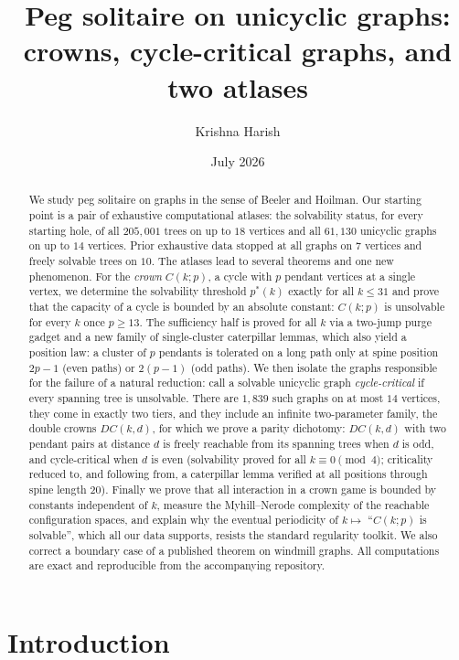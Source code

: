 \documentclass[11pt]{article}
\title{Peg solitaire on unicyclic graphs:\\ crowns, cycle-critical graphs, and two atlases}
\author{Krishna Harish}
\date{July 2026}
\theoremstyle{definition}
\begin{document}
\maketitle

\begin{abstract}
We study peg solitaire on graphs in the sense of Beeler and Hoilman.
Our starting point is a pair of exhaustive computational atlases: the
solvability status, for every starting hole, of all $205{,}001$ trees
on up to $18$ vertices and all $61{,}130$ unicyclic graphs on up to
$14$ vertices. Prior exhaustive data stopped at all graphs on $7$
vertices and freely solvable trees on $10$. The atlases lead to
several theorems and one new phenomenon. For the \emph{crown}
$C(k;p)$, a cycle with $p$ pendant vertices at a single vertex, we
determine the solvability threshold $p^*(k)$ exactly for all
$k\le 31$ and prove that the capacity of a cycle is bounded by an
absolute constant: $C(k;p)$ is unsolvable for every $k$ once
$p\ge 13$. The sufficiency half is proved for all $k$ via a
two-jump purge gadget and a new family of single-cluster caterpillar
lemmas, which also yield a position law: a cluster of $p$ pendants is
tolerated on a long path only at spine position $2p-1$ (even paths)
or $2(p-1)$ (odd paths). We then isolate the graphs responsible for
the failure of a natural reduction: call a solvable unicyclic graph
\emph{cycle-critical} if every spanning tree is unsolvable. There
are $1{,}839$ such graphs on at most $14$ vertices, they come in
exactly two tiers, and they include an infinite two-parameter family,
the double crowns $DC(k,d)$, for which we prove a parity dichotomy:
$DC(k,d)$ with two pendant pairs at distance $d$ is freely reachable
from its spanning trees when $d$ is odd, and cycle-critical when $d$
is even (solvability proved for all $k\equiv 0 \pmod 4$; criticality
reduced to, and following from, a caterpillar lemma verified at all
positions through spine length $20$). Finally we prove that all
interaction in a
crown game is bounded by constants independent of $k$, measure the
Myhill--Nerode complexity of the reachable configuration spaces, and
explain why the eventual periodicity of $k\mapsto$ ``$C(k;p)$ is
solvable'', which all our data supports, resists the standard
regularity toolkit. We also correct a boundary case of a published
theorem on windmill graphs. All computations are exact and
reproducible from the accompanying repository.
\end{abstract}

\section{Introduction}
\end{document}
